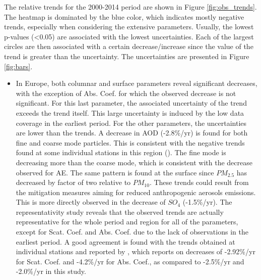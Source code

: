 \documentclass[journal abbreviation, manuscript]{copernicus}
\begin{document}
The relative trends for the 2000-2014 period are shown in Figure \ref{fig:obs_trends}. The heatmap is dominated by the blue color, which indicates mostly negative trends, especially when considering the extensive parameters. Usually, the lowest p-values (<0.05) are associated with the lowest uncertainties. Each of the largest circles are then associated with a certain decrease/increase since the value of the trend is greater than the uncertainty. The uncertainties are presented in Figure \ref{fig:bars}.

\begin{itemize}
 \item In Europe, both columnar and surface parameters reveal significant decreases, with the exception of Abs. Coef. for which the observed decrease is not significant. For this last parameter, the associated uncertainty of the trend exceeds the trend itself. This large uncertainty is induced by the low data coverage in the earliest period. For the other parameters, the uncertainties are lower than the trends. A decrease in AOD (-2.8\%/yr) is found for both fine and coarse mode particles. This is consistent with the negative trends found at some individual stations in this region (\cite{glantz2019}). The fine mode is decreasing more than the coarse mode, which is consistent with the decrease observed for AE. The same pattern is found at the surface since $PM_{2.5}$ has decreased by factor of two relative to $PM_{10}$. These trends could result from the mitigation measures aiming for reduced anthropogenic aerosols emissions. This is more directly observed in the decrease of $SO_{4}$ (-1.5\%/yr). The representativity study reveals that the observed trends are actually representative for the whole period and region for all of the parameters, except for Scat. Coef. and Abs. Coef. due to the lack of observations in the earliest period. A good agreement is found with the trends obtained at individual stations and reported by \cite{collaudcoenprep}, which reports on decreases of -2.92\%/yr for Scat. Coef. and -4.2\%/yr for Abs. Coef., as compared to -2.5\%/yr and -2.0\%/yr in this study.

\end{itemize}
\end{document}

